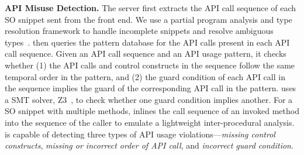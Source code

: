 {\bf API Misuse Detection.} The server first extracts the API call sequence of each SO snippet sent from the front end. We use a partial program analysis and type resolution framework to handle incomplete snippets and resolve ambiguous types~\cite{subramanian2014live}. {\tool} then queries the pattern database for the API calls present in each API call sequence. Given an API call sequence and an API usage pattern, it checks whether (1) the API calls and control constructs in the sequence follow the same temporal order in the pattern, and (2) the guard condition of each API call in the sequence implies the guard of the corresponding API call in the pattern. {\tool} uses a SMT solver, Z3~\cite{de2008z3}, to check whether one guard condition implies another. For a SO snippet with multiple methods, {\tool} inlines the call sequence of an invoked method into the sequence of the caller to emulate a lightweight inter-procedural analysis. {\tool} is capable of detecting three types of API usage violations---{\em missing control constructs}, {\em missing or incorrect order of API call}, and {\em incorrect guard condition}.



